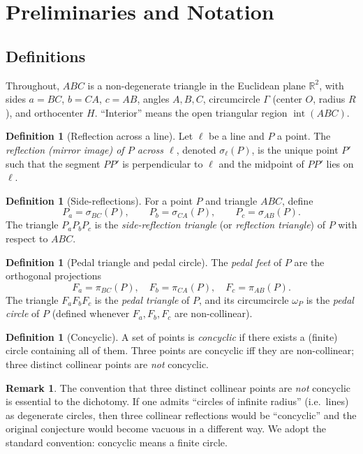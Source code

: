 \documentclass[11pt,a4paper]{article}
\theoremstyle{definition}
\newtheorem{definition}[theorem]{Definition}
\newtheorem{remark}[theorem]{Remark}
\newcommand{\R}{\mathbb{R}}
\newcommand{\Pa}{P_{a}}
\newcommand{\Pb}{P_{b}}
\newcommand{\Pc}{P_{c}}
\newcommand{\Fa}{F_{a}}
\newcommand{\Fb}{F_{b}}
\newcommand{\Fc}{F_{c}}
\newcommand{\circc}{\Gamma}
\newcommand{\pedalc}{\omega_{P}}
\begin{document}
\section{Preliminaries and Notation}\label{sec:prelim}

\subsection{Definitions}

Throughout, $ABC$ is a non-degenerate triangle in the Euclidean plane $\R^{2}$, with sides $a=BC$, $b=CA$, $c=AB$, angles $A,B,C$, circumcircle $\circc$ (center $O$, radius $R$), and orthocenter $H$. ``Interior'' means the open triangular region $\operatorname{int}(ABC)$.

\begin{definition}[Reflection across a line]\label{def:refl}
Let $\ell$ be a line and $P$ a point. The \emph{reflection (mirror image) of $P$ across $\ell$}, denoted $\sigma_{\ell}(P)$, is the unique point $P'$ such that the segment $PP'$ is perpendicular to $\ell$ and the midpoint of $PP'$ lies on $\ell$.
\end{definition}

\begin{definition}[Side-reflections]\label{def:sideref}
For a point $P$ and triangle $ABC$, define
\[
\Pa=\sigma_{BC}(P),\qquad \Pb=\sigma_{CA}(P),\qquad \Pc=\sigma_{AB}(P).
\]
The triangle $\Pa\Pb\Pc$ is the \emph{side-reflection triangle} (or \emph{reflection triangle}) of $P$ with respect to $ABC$.
\end{definition}

\begin{definition}[Pedal triangle and pedal circle]\label{def:pedal}
The \emph{pedal feet} of $P$ are the orthogonal projections
\[
\Fa=\pi_{BC}(P),\quad \Fb=\pi_{CA}(P),\quad \Fc=\pi_{AB}(P).
\]
The triangle $\Fa\Fb\Fc$ is the \emph{pedal triangle} of $P$, and its circumcircle $\pedalc$ is the \emph{pedal circle} of $P$ (defined whenever $\Fa,\Fb,\Fc$ are non-collinear).
\end{definition}

\begin{definition}[Concyclic]\label{def:concyclic}
A set of points is \emph{concyclic} if there exists a (finite) circle containing all of them. Three points are concyclic iff they are non-collinear; three distinct collinear points are \emph{not} concyclic.
\end{definition}

\begin{remark}\label{rem:concyclic-degenerate}
The convention that three distinct collinear points are \emph{not} concyclic is essential to the dichotomy. If one admits ``circles of infinite radius'' (i.e.\ lines) as degenerate circles, then three collinear reflections would be ``concyclic'' and the original conjecture would become vacuous in a different way. We adopt the standard convention: concyclic means a finite circle.
\end{remark}
\end{document}
